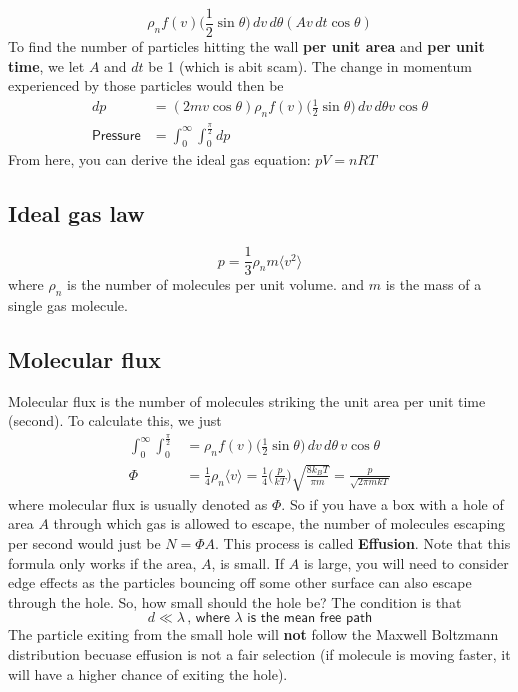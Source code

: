 \begin{equation}
    \rho_n f(v)\bigg(\frac{1}{2}\sin\theta\bigg)\,dv\,d\theta (A v \,dt \cos \theta )
\end{equation}
To find the number of particles hitting the wall \textbf{per unit area} and \textbf{per unit time}, we let $A$ and $dt$ be 1 (which is abit scam). The change in momentum experienced by those particles would then be 
\begin{align}
    dp &= (2mv \cos \theta)  \rho_n f(v)\bigg(\frac{1}{2}\sin\theta\bigg)\,dv\,d\theta v \cos \theta \\
    \textsf{Pressure} &= \int_{0}^{\infty}\int_0^{\frac{\pi}{2}}dp 
\end{align}
From here, you can derive the ideal gas equation: $pV=nRT$

\subsection{Ideal gas law}
\begin{equation}
    p=\frac{1}{3}\rho_n m \langle v^2 \rangle
\end{equation}
where $\rho_n$ is the number of molecules per unit volume. and $m$ is the mass of a single gas molecule.

\subsection{Molecular flux}
Molecular flux is the number of molecules striking the unit area per unit time (second). To calculate this, we just
\begin{align}
    \int_{0}^{\infty}\int_0^{\frac{\pi}{2}} &=\rho_n f(v)\bigg(\frac{1}{2}\sin\theta\bigg)\,dv\,d\theta \,v \cos \theta \nonumber \\
    \Phi &= \frac{1}{4}\rho_n \langle v \rangle = \frac{1}{4} \bigg(\frac{p}{kT}\bigg) \sqrt{\frac{8k_BT}{\pi m}}= \frac{p}{\sqrt{2\pi m kT}}
\end{align}
where molecular flux is usually denoted as $\Phi$. So if you have a box with a hole of area $A$ through which gas is allowed to escape, the number of molecules escaping per second would just be $N=\Phi A$. This process is called \textbf{Effusion}. Note that this formula only works if the area, $A$, is small. If $A$ is large, you will need to consider edge effects as the particles bouncing off some other surface can also escape through the hole. So, how small should the hole be? The condition is that 
\begin{equation}
    d \ll \lambda \, \textsf{, where $\lambda$ is the mean free path}
\end{equation}
The particle exiting from the small hole will \textbf{not} follow the Maxwell Boltzmann distribution becuase effusion is not a fair selection (if molecule is moving faster, it will have a higher chance of exiting the hole). 
